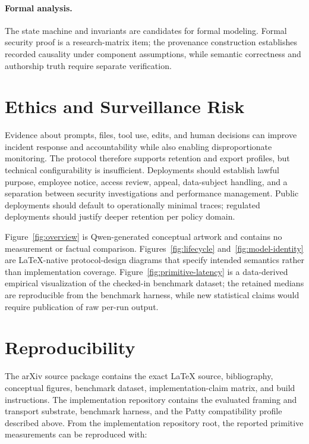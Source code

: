 \documentclass[10pt]{article}
\begin{document}
\paragraph{Formal analysis.}
The state machine and invariants are candidates for formal modeling. Formal security proof is a research-matrix item; the provenance construction establishes recorded causality under component assumptions, while semantic correctness and authorship truth require separate verification.

\section{Ethics and Surveillance Risk}

Evidence about prompts, files, tool use, edits, and human decisions can improve incident response and accountability while also enabling disproportionate monitoring. The protocol therefore supports retention and export profiles, but technical configurability is insufficient. Deployments should establish lawful purpose, employee notice, access review, appeal, data-subject handling, and a separation between security investigations and performance management. Public deployments should default to operationally minimal traces; regulated deployments should justify deeper retention per policy domain.

Figure~\ref{fig:overview} is Qwen-generated conceptual artwork and contains no measurement or factual comparison. Figures~\ref{fig:lifecycle} and~\ref{fig:model-identity} are LaTeX-native protocol-design diagrams that specify intended semantics rather than implementation coverage. Figure~\ref{fig:primitive-latency} is a data-derived empirical visualization of the checked-in benchmark dataset; the retained medians are reproducible from the benchmark harness, while new statistical claims would require publication of raw per-run output.

\section{Reproducibility}

The arXiv source package contains the exact LaTeX source, bibliography, conceptual figures, benchmark dataset, implementation-claim matrix, and build instructions. The implementation repository contains the evaluated framing and transport substrate, benchmark harness, and the Patty compatibility profile described above. From the implementation repository root, the reported primitive measurements can be reproduced with:
\end{document}
